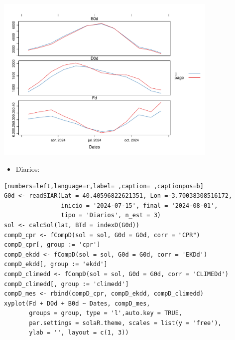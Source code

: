 \begin{itemize}
\begin{itemize}
\begin{center}
\includegraphics[width=0.8\textwidth]{figuras/codigo-fcompdmes.pdf}
\end{center}
\begin{itemize}
\item Diarios:
\end{itemize}
\begin{lstlisting}[numbers=left,language=r,label= ,caption= ,captionpos=b]
G0d <- readSIAR(Lat = 40.40596822621351, Lon =-3.70038308516172,
                inicio = '2024-07-15', final = '2024-08-01',
                tipo = 'Diarios', n_est = 3)
sol <- calcSol(lat, BTd = indexD(G0d))
compD_cpr <- fCompD(sol = sol, G0d = G0d, corr = "CPR")
compD_cpr[, group := 'cpr']
compD_ekdd <- fCompD(sol = sol, G0d = G0d, corr = 'EKDd')
compD_ekdd[, group := 'ekdd']
compD_climedd <- fCompD(sol = sol, G0d = G0d, corr = 'CLIMEDd')
compD_climedd[, group := 'climedd']
compD_mes <- rbind(compD_cpr, compD_ekdd, compD_climedd)
xyplot(Fd + D0d + B0d ~ Dates, compD_mes,
       groups = group, type = 'l',auto.key = TRUE,
       par.settings = solaR.theme, scales = list(y = 'free'),
       ylab = '', layout = c(1, 3))
\end{lstlisting}


\end{itemize}
\end{itemize}
